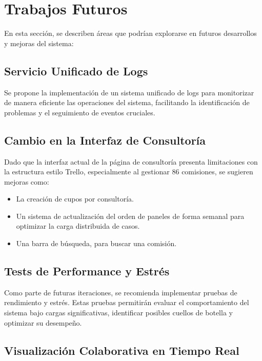 \chapter{Trabajos Futuros}

En esta sección, se describen áreas que podrían explorarse en futuros desarrollos y mejoras del sistema:

\section{Servicio Unificado de Logs}

Se propone la implementación de un sistema unificado de logs para monitorizar de manera eficiente las operaciones del sistema, facilitando la identificación de problemas y el seguimiento de eventos cruciales.

\section{Cambio en la Interfaz de Consultoría}

Dado que la interfaz actual de la página de consultoría presenta limitaciones con la estructura estilo Trello, especialmente al gestionar 86 comisiones, se sugieren mejoras como:

\begin{itemize}
\item La creación de cupos por consultoría.
\item Un sistema de actualización del orden de paneles de forma semanal para optimizar la carga distribuida de casos.
\item  Una barra de búsqueda, para buscar una comisión.
\end{itemize}

\section{Tests de Performance y Estrés}

Como parte de futuras iteraciones, se recomienda implementar pruebas de rendimiento y estrés. Estas pruebas permitirán evaluar el comportamiento del sistema bajo cargas significativas, identificar posibles cuellos de botella y optimizar su desempeño.

\section{Visualización Colaborativa en Tiempo Real}

